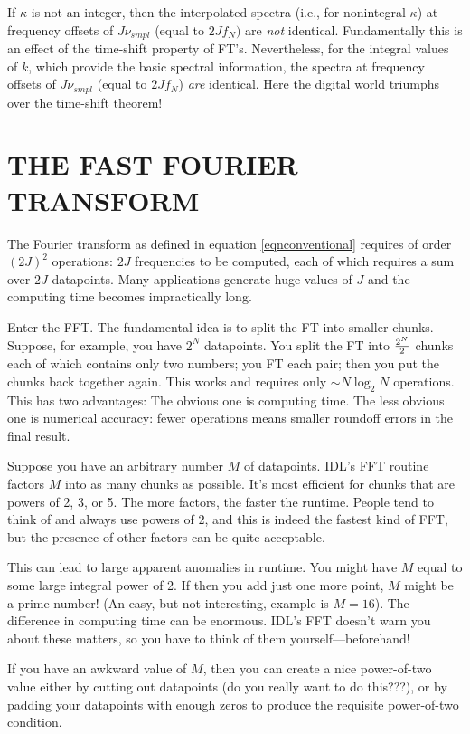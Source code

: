 \documentclass[psfig,preprint]{aastex}
\begin{document}
	If $\kappa$ is not an integer, then the interpolated spectra
(i.e., for nonintegral $\kappa$) at frequency offsets of $J \nu_{smpl}$
(equal to $2J f_N)$ are {\it not} identical. Fundamentally this is an
effect of the time-shift property of FT's. Nevertheless, for the
integral values of $k$, which provide the basic spectral information,
the spectra at frequency offsets of $J \nu_{smpl}$ (equal to $2J f_N$)
{\it are} identical. Here the digital world triumphs over the time-shift
theorem!

\section{THE FAST FOURIER TRANSFORM}

	The Fourier transform as defined in equation
\ref{eqnconventional} requires of order $(2J)^2$ operations: $2J$
frequencies to be computed, each of which requires a sum over $2J$
datapoints. Many applications generate huge values of $J$ and the
computing time becomes impractically long.

	Enter the FFT. The fundamental idea is to split the FT into
smaller chunks. Suppose, for example, you have $2^N$ datapoints. You
split the FT into $2^N \over 2$ chunks each of which contains only two
numbers; you FT each pair; then you put the chunks back together again.
This works and requires only $\sim N \log_2 N$ operations. This has two
advantages:  The obvious one is computing time. The less obvious one is
numerical accuracy: fewer operations means smaller roundoff errors in
the final result.

	Suppose you have an arbitrary number $M$ of datapoints. IDL's
FFT routine factors $M$ into as many chunks as possible. It's most
efficient for chunks that are powers of 2, 3, or 5. The more factors,
the faster the runtime. People tend to think of and always use powers of
2, and this is indeed the fastest kind of FFT, but the presence of other
factors can be quite acceptable.

	This can lead to large apparent anomalies in runtime. You might
have $M$ equal to some large integral power of 2. If then you add just
one more point, $M$ might be a prime number! (An easy, but not
interesting, example is $M=16$). The difference in computing time can be
enormous. IDL's FFT doesn't warn you about these matters, so you have to
think of them yourself---beforehand!

	If you have an awkward value of $M$, then you can create a nice
power-of-two value either by cutting out datapoints (do you really want
to do this???), or by padding your datapoints with enough zeros to
produce the requisite power-of-two condition. 
\end{document}
